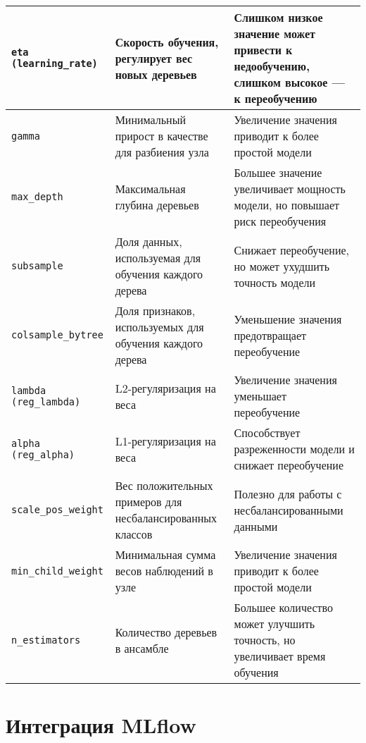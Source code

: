 \begin{longtable}{|p{4cm}|p{6cm}|p{6cm}|}
	\texttt{eta (learning\_rate)} & Скорость обучения, регулирует вес новых деревьев          & Слишком низкое значение может привести к недообучению, слишком высокое — к переобучению \\
	\hline
	\texttt{gamma}                & Минимальный прирост в качестве для разбиения узла         & Увеличение значения приводит к более простой модели                                     \\
	\hline
	\texttt{max\_depth}           & Максимальная глубина деревьев                             & Большее значение увеличивает мощность модели, но повышает риск переобучения             \\
	\hline
	\texttt{subsample}            & Доля данных, используемая для обучения каждого дерева     & Снижает переобучение, но может ухудшить точность модели                                 \\
	\hline
	\texttt{colsample\_bytree}    & Доля признаков, используемых для обучения каждого дерева  & Уменьшение значения предотвращает переобучение                                          \\
	\hline
	\texttt{lambda (reg\_lambda)} & L2-регуляризация на веса                                  & Увеличение значения уменьшает переобучение                                              \\
	\hline
	\texttt{alpha (reg\_alpha)}   & L1-регуляризация на веса                                  & Способствует разреженности модели и снижает переобучение                                \\
	\hline
	\texttt{scale\_pos\_weight}   & Вес положительных примеров для несбалансированных классов & Полезно для работы с несбалансированными данными                                        \\
	\hline
	\texttt{min\_child\_weight}   & Минимальная сумма весов наблюдений в узле                 & Увеличение значения приводит к более простой модели                                     \\
	\hline
	\texttt{n\_estimators}        & Количество деревьев в ансамбле                            & Большее количество может улучшить точность, но увеличивает время обучения               \\
\end{longtable}


\section{Интеграция MLflow}

